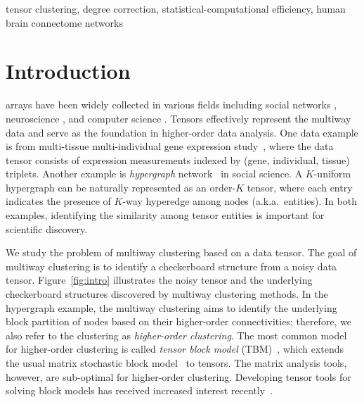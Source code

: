 \documentclass[lettersize,onecolumn,journal]{IEEEtran}
\theoremstyle{definition}
\theoremstyle{definition}
\begin{document}
\begin{IEEEkeywords}
tensor clustering, degree correction, statistical-computational efficiency, human brain connectome networks
\end{IEEEkeywords}




\section{Introduction}\label{sec:intro}
 arrays have been widely collected in various fields including social networks \citep{anandkumar2014tensor}, neuroscience \citep{wang2017bayesian}, and computer science \citep{koniusz2016sparse}. Tensors effectively represent the multiway data and serve as the foundation in higher-order data analysis. One data example is from multi-tissue multi-individual gene expression study~\citep{wang2019three,hore2016tensor}, where the data tensor consists of expression measurements indexed by (gene, individual, tissue) triplets. Another example is \emph{hypergraph} network~\citep{ghoshdastidar2017uniform,ghoshdastidar2017consistency,ahn2019community,ke2019community} in social science. A $K$-uniform hypergraph can be naturally represented as an order-$K$ tensor, where each entry indicates the presence of $K$-way hyperedge among nodes (a.k.a.\ entities). In both examples, identifying the similarity among tensor entities is important for scientific discovery. 


We study the problem of multiway clustering based on a data tensor. The goal of multiway clustering is to identify a checkerboard structure from a noisy data tensor. Figure~\ref{fig:intro} illustrates the noisy tensor and the underlying checkerboard structures discovered by multiway clustering methods. In the hypergraph example, the multiway clustering aims to identify the underlying block partition of nodes based on their higher-order connectivities; therefore, we also refer to the clustering as \emph{higher-order clustering}. The most common model for higher-order clustering is called \emph{tensor block model} (TBM)~\citep{wang2019multiway}, which extends the usual matrix stochastic block model~\citep{abbe2017community} to tensors. The matrix analysis tools, however, are sub-optimal for higher-order clustering. Developing tensor tools for solving block models has received increased interest recently~\citep{ wang2019multiway,chi2020provable,han2020exact}. 
\end{document}
